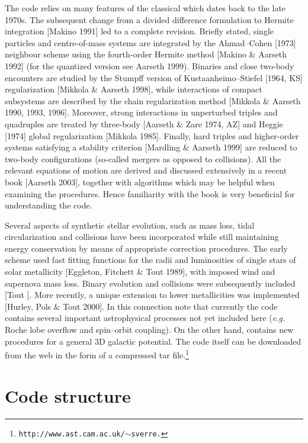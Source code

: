 \documentclass[12pt]{article}
\begin{document}
The code relies on many features of the classical {} which dates
back to the late 1970s.
The subsequent change from a divided difference formulation to Hermite
integration [Makino 1991] led to a complete revision.
Briefly stated, single particles and centre-of-mass systems are integrated
by the Ahmad--Cohen [1973] neighbour scheme using the fourth-order Hermite
method [Makino \& Aarseth 1992] (for the quantized version see Aarseth 1999).
Binaries and close two-body encounters are studied by the Stumpff version of
Kustaanheimo--Stiefel [1964, KS] regularization [Mikkola \& Aarseth 1998],
while interactions of compact subsystems are described by the chain
regularization method [Mikkola \& Aarseth 1990, 1993, 1996].
Moreover, strong interactions in unperturbed triples and quadruples are
treated by three-body [Aarseth \& Zare 1974, AZ] and Heggie [1974] global
regularization [Mikkola 1985].
Finally, hard triples and higher-order systems satisfying a stability
criterion [Mardling \& Aarseth 1999] are reduced to two-body configurations
(so-called mergers as opposed to collisions).
All the relevant equations of motion are derived and discussed extensively in
a recent book [Aarseth 2003], together with algorithms which may be helpful
when examining the {} procedures.
Hence familiarity with the book is very beneficial for understanding the code.

Several aspects of synthetic stellar evolution, such as mass loss, tidal
circularization and collisions have been incorporated while still maintaining
energy conservation by means of appropriate correction procedures.
The early scheme used fast fitting functions for the radii and luminosities of
single stars of solar metallicity [Eggleton, Fitchett \& Tout 1989], with
imposed wind and supernova mass loss.
Binary evolution and collisions were subsequently included [Tout ].
More recently, a unique extension to lower metallicities was implemented
[Hurley, Pols \& Tout 2000].
In this connection note that currently the {} code {}
contains several important astrophysical processes not yet included here
({\it e.g.} Roche lobe overflow and spin--orbit coupling).
On the other hand, {} contains new procedures for a general 3D
galactic potential.
The code itself can be downloaded from the web in the form of a compressed
tar file.\footnote{\tt http://www.ast.cam.ac.uk/$\sim$sverre.}

\section{Code structure}
\end{document}
